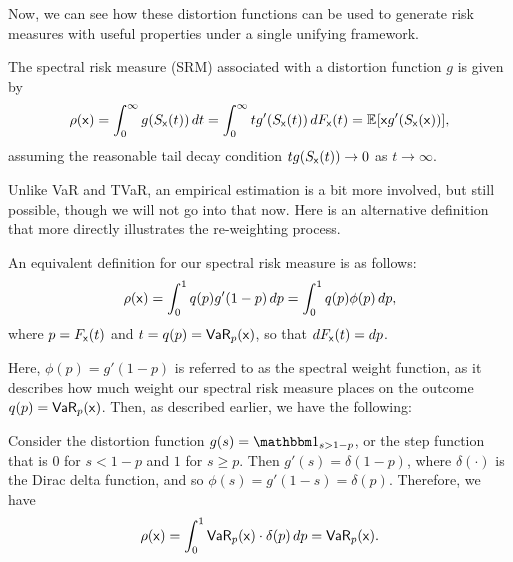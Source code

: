 Now, we can see how these distortion functions can be used to generate risk measures with useful properties under a single unifying framework.

\begin{definition}
    The spectral risk measure (SRM) associated with a distortion function $g$ is given by 
    \begin{equation}
        \rs{\rx}=\int_0^\infty g(\Sxd{t})\,dt = \int_0^\infty tg'(\Sxd{t})\,d\Fxd{t} = \EX{}{\rx g'(\Sxd{\rx})},
    \end{equation}
    assuming the reasonable tail decay condition $tg(\Sxd{t}) \to 0$ as $t\to\infty$.
\end{definition}

Unlike VaR and TVaR, an empirical estimation is a bit more involved, but still possible, though we will not go into that now\cite{pandey2019estimationspectralriskmeasures}. Here is an alternative definition that more directly illustrates the re-weighting process.

\begin{definition}
    An equivalent definition for our spectral risk measure is as follows:
    \begin{equation}
        \rs{\rx} = \int_0^1 q(p) g'(1-p)\,dp = \int_0^1 q(p)\phi(p)\,dp ,
    \end{equation}
    where $p = \Fxd{t}$ and $t=q(p)=\VaR{p}{\rx}$, so that $d\Fxd{t} = dp$. 
\end{definition}

Here, $\phi(p) = g'(1-p)$ is referred to as the spectral weight function, as it describes how much weight our spectral risk measure places on the outcome $q(p)=\VaR{p}{\rx}$. Then, as described earlier, we have the following:

\begin{example}
    Consider the distortion function $g(s) = \mbm{1}_{s>1-p}$, or the step function that is $0$ for $s<1-p$ and $1$ for $s\ge p$. Then $g'(s)=\delta(1-p)$, where $\delta(\cdot)$ is the Dirac delta function, and so $\phi(s) = g'(1-s) = \delta(p)$. Therefore, we have
    \begin{equation}
        \rs{\rx} = \int_0^1 \VaR{p}{\rx}\cdot \delta(p)\,dp = \VaR{p}{\rx}.
    \end{equation}
\end{example}


